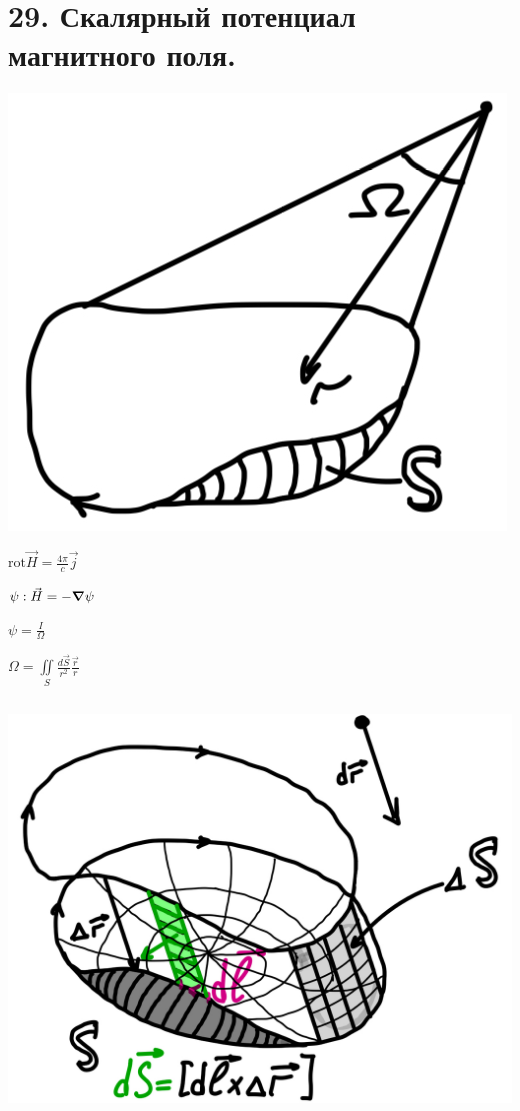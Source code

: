 \section*{29. Скалярный потенциал магнитного поля.}
 
\noindent
\begin{minipage}[c]{0.3\textwidth} %
    \includegraphics[width=\textwidth]{im/64.png}{} %
\end{minipage}%
\hfill
\begin{minipage}[c]{0.55\textwidth} %
    \( \mathrm{rot}\vec{H}=\frac{4\pi}{c}\vec{j}   \) 
    
    \( \psi: \vec{H}=-\grad \psi \)
    
    \( \psi = \frac{I}\Omega  \) 

    \( \Omega =\underset{S}{\iint}\frac{d\vec{S}}{r^2} \frac{\vec{r}}{r}   \) 
\end{minipage}
\[\text{ }\]
\noindent
\begin{minipage}[c]{0.4\textwidth} %
    \includegraphics[width=\textwidth]{im/65.png}{} %
\end{minipage}%
